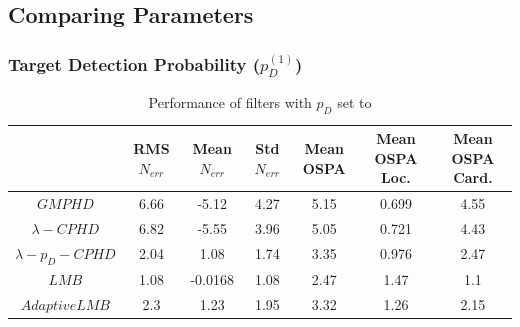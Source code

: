 \documentclass{article}
\begin{document}
\subsection*{Comparing Parameters}

\subsubsection*{Target Detection Probability ($p_D^{(1)}$)}
\begin{table}[H]
  \centering
  \begin{tabular}{ c| c | c | c | c | c | c }
    & RMS $N_{err}$ & Mean $N_{err}$ & Std $N_{err}$ & Mean OSPA & Mean OSPA Loc. & Mean OSPA Card.\\
    \hline
    $GMPHD$ & 6.66 & -5.12 & 4.27 & 5.15 & 0.699 & 4.55 \\
    $\lambda-CPHD$ & 6.82 & -5.55 & 3.96 & 5.05 & 0.721 & 4.43 \\
    $\lambda-p_D-CPHD$ & 2.04 & 1.08 & 1.74 & 3.35 & 0.976 & 2.47 \\
    $LMB$ & 1.08 & -0.0168 & 1.08 & 2.47 & 1.47 & 1.1 \\
    $Adaptive LMB$ & 2.3 & 1.23 & 1.95 & 3.32 & 1.26 & 2.15 \\
  \end{tabular}
  \caption{Performance of filters with $p_D$ set to}
  \label{tab:low_pd}
\end{table}
\end{document}
